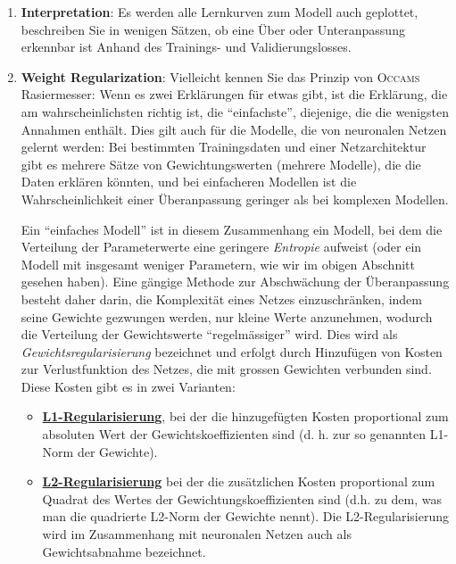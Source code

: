 \documentclass[11pt,a4paper,headinclude]{scrartcl}
\begin{document}
\begin{Aufgabe}
\begin{enumerate}
		\item \textbf{Interpretation}: Es werden alle Lernkurven zum Modell auch geplottet, beschreiben Sie in wenigen Sätzen, ob eine Über oder Unteranpassung erkennbar ist Anhand des Trainings- und Validierungslosses.	
		\item \textbf{Weight Regularization}: Vielleicht kennen Sie das Prinzip von \textsc{Occams} Rasiermesser: Wenn es zwei Erklärungen für etwas gibt, ist die Erklärung, die am wahrscheinlichsten richtig ist, die "`einfachste"', diejenige, die die wenigsten Annahmen enthält. Dies gilt auch für die Modelle, die von neuronalen Netzen gelernt werden: Bei bestimmten Trainingsdaten und einer Netzarchitektur gibt es mehrere Sätze von Gewichtungswerten (mehrere Modelle), die die Daten erklären könnten, und bei einfacheren Modellen ist die Wahrscheinlichkeit einer Überanpassung geringer als bei komplexen Modellen.
		
		Ein "`einfaches Modell"' ist in diesem Zusammenhang ein Modell, bei dem die Verteilung der Parameterwerte eine geringere \emph{Entropie} aufweist (oder ein Modell mit insgesamt weniger Parametern, wie wir im obigen Abschnitt gesehen haben). Eine gängige Methode zur Abschwächung der Überanpassung besteht daher darin, die Komplexität eines Netzes einzuschränken, indem seine Gewichte gezwungen werden, nur kleine Werte anzunehmen, wodurch die Verteilung der Gewichtswerte "`regelmässiger"' wird. Dies wird als \emph{Gewichtsregularisierung} bezeichnet und erfolgt durch Hinzufügen von Kosten zur Verlustfunktion des Netzes, die mit grossen Gewichten verbunden sind. Diese Kosten gibt es in zwei Varianten:
		
		\begin{itemize}
			\item \href{https://developers.google.com/machine-learning/glossary/#L1_regularization}{\textbf{L1-Regularisierung}}, bei der die hinzugefügten Kosten proportional zum absoluten Wert der Gewichtskoeffizienten sind (d. h. zur so genannten L1-Norm der Gewichte).
			
			\item \href{https://developers.google.com/machine-learning/glossary/#L2_regularization}{\textbf{L2-Regularisierung}} bei der die zusätzlichen Kosten proportional zum Quadrat des Wertes der Gewichtungskoeffizienten sind (d.h. zu dem, was man die quadrierte L2-Norm der Gewichte nennt). Die L2-Regularisierung wird im Zusammenhang mit neuronalen Netzen auch als Gewichtsabnahme bezeichnet. 

		\end{itemize}
	

\end{enumerate}
\end{Aufgabe}
\end{document}
